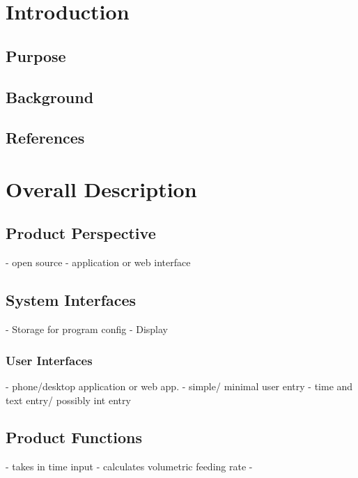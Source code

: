 \documentclass[10pt,draftclsnofoot,onecolumn]{IEEEtran}
\begin{document}
\title{}
\author{Alison Jones \& Parker Okonek}
\maketitle
\begin{abstract}
\end{abstract}
\newpage
\section{Introduction}
\subsection{Purpose}
\subsection{Background}
\subsection{References}

\section{Overall Description}
\subsection{Product Perspective}
- open source
- application or web interface

\subsection{System Interfaces}
- Storage for program config
- Display

\subsubsection{User Interfaces}
- phone/desktop application or web app.
- simple/ minimal user entry
- time and text entry/ possibly int entry

\subsubsection{}
\subsection{Product Functions}
- takes in time input
- calculates volumetric feeding rate
- 
\end{document}
